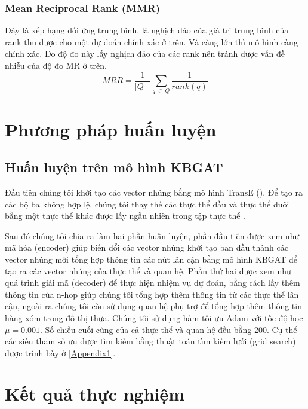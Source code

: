 \subsubsection{Mean Reciprocal Rank (MMR)}

Đây là xếp hạng đối ứng trung bình, là nghịch đảo của giá trị trung bình của rank thu được cho một dự đoán chính xác ở trên. Và càng lớn thì mô hình càng chính xác. Do độ đo này lấy nghịch đảo của các rank nên tránh dược vấn đề nhiễu của độ đo MR ở trên.
\[MRR =\frac{1}{\mid Q \mid} \sum_{q~ \in ~Q} \frac{1}{rank(q)}\]

\section{Phương pháp huấn luyện}



\subsection{Huấn luyện trên mô hình KBGAT}

Đầu tiên chúng tôi khởi tạo các vector nhúng bằng mô hình TransE (\cite{bordes2013translating}). Để tạo ra các bộ ba không hợp lệ, chúng tôi thay thế các thực thể đầu và thực thể đuôi bằng một thực thể khác được lấy ngẫu nhiên trong tập thực thể .

Sau đó chúng tôi chia ra làm hai phần huấn luyện, phần đầu tiên được xem như mã hóa (encoder) giúp biến đổi các vector nhúng khởi tạo ban đầu thành các vector nhúng mới tổng hợp thông tin các nút lân cận bằng mô hình KBGAT để tạo ra các vector nhúng của thực thể và quan hệ. Phần thứ hai được xem như quá trình giải mã (decoder) để thực hiện nhiệm vụ dự đoán, bằng cách lấy thêm thông tin của n-hop giúp chúng tôi tổng hợp thêm thông tin từ các thực thể lân cận, ngoài ra chúng tôi còn sử dụng quan hệ phụ trợ để tổng hợp thêm thông tin hàng xóm trong đồ thị thưa. Chúng tôi sử dụng hàm tối ưu Adam với tốc độ học $\mu = 0.001$. Số chiều cuối cùng của cả thực thể và quan hệ đều bằng 200. Cụ thể các siêu tham số ưu được tìm kiếm bằng thuật toán tìm kiếm lưới (grid search) được trình bày ở \appendixname\ref{Appendix1}.

\section{Kết quả thực nghiệm}
\label{sec:Experiment}

